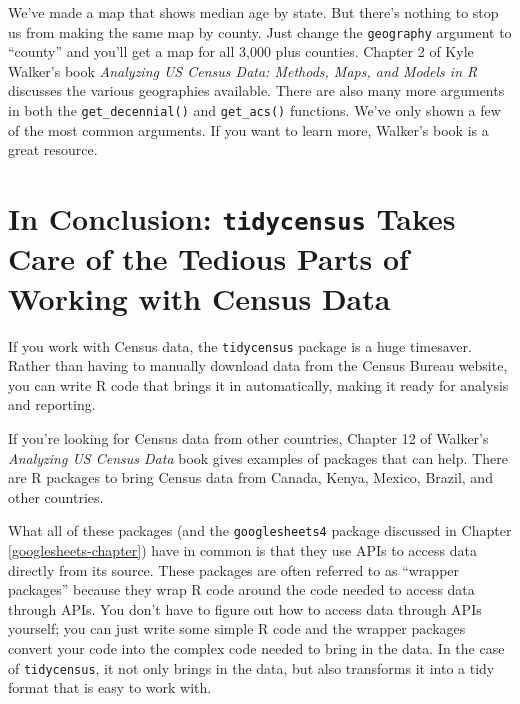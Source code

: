 \documentclass[
]{book}
\begin{document}
We've made a map that shows median age by state. But there's nothing to stop us from making the same map by county. Just change the \texttt{geography} argument to ``county'' and you'll get a map for all 3,000 plus counties. Chapter 2 of Kyle Walker's book \emph{Analyzing US Census Data: Methods, Maps, and Models in R} discusses the various geographies available. There are also many more arguments in both the \texttt{get\_decennial()} and \texttt{get\_acs()} functions. We've only shown a few of the most common arguments. If you want to learn more, Walker's book is a great resource.

\hypertarget{in-conclusion-tidycensus-takes-care-of-the-tedious-parts-of-working-with-census-data}{%
\section*{\texorpdfstring{In Conclusion: \texttt{tidycensus} Takes Care of the Tedious Parts of Working with Census Data}{In Conclusion: tidycensus Takes Care of the Tedious Parts of Working with Census Data}}\label{in-conclusion-tidycensus-takes-care-of-the-tedious-parts-of-working-with-census-data}}

If you work with Census data, the \texttt{tidycensus} package is a huge timesaver. Rather than having to manually download data from the Census Bureau website, you can write R code that brings it in automatically, making it ready for analysis and reporting.

If you're looking for Census data from other countries, Chapter 12 of Walker's \emph{Analyzing US Census Data} book gives examples of packages that can help. There are R packages to bring Census data from Canada, Kenya, Mexico, Brazil, and other countries.

What all of these packages (and the \texttt{googlesheets4} package discussed in Chapter \ref{googlesheets-chapter}) have in common is that they use APIs to access data directly from its source. These packages are often referred to as ``wrapper packages'' because they wrap R code around the code needed to access data through APIs. You don't have to figure out how to access data through APIs yourself; you can just write some simple R code and the wrapper packages convert your code into the complex code needed to bring in the data. In the case of \texttt{tidycensus}, it not only brings in the data, but also transforms it into a tidy format that is easy to work with.
\end{document}
